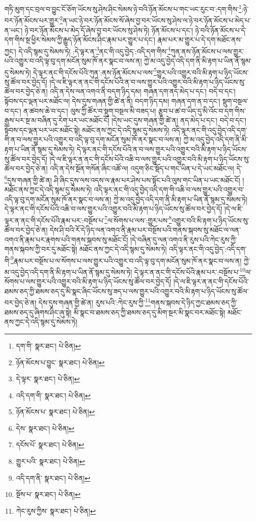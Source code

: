 གཏི་མུག་དང་བྲལ་བ་བྱུང་ངོ་ཅོག་ཡོངས་སུ་ཤེས་ཤིང་སེམས་ཉེ་བའི་ཉོན་མོངས་པ་གང་ཡང་རུང་བ་:དག་གིས་\footnote{དག་གི་  སྣར་ཐང་།  པེ་ཅིན། }:ཉེ་བར་ཉོན་མོངས་པར་གྱུར་\footnote{ཉོན་མོངས་པ་བྱུང་  སྣར་ཐང་།  པེ་ཅིན། }ན་ཡང་ཉེ་བར་ཉོན་མོངས་སོ་ཞེས་བྱ་བར་ཡོངས་སུ་ཤེས་ལ་ཉེ་བར་ཉོན་མོངས་པ་མེད་པ་ན་ཡང་། ཉེ་བར་ཉོན་མོངས་པ་མེད་དོ་ཞེས་བྱ་བར་ཡོངས་སུ་ཤེས་ཏེ། ཉོན་མོངས་པ་དང་། ཉེ་བའི་ཉོན་མོངས་པ་དེ་དག་གིས་སྔ་ཕྱིར་སེམས་ཀྱི་རྒྱུད་ཉོན་མོངས་ཤིང་རྣམ་པར་གྱུར་པ་དང་། རྣམ་པར་མ་གྱུར་པ་དེ་དག་མཐོང་ནས་ཀྱང་། དེ་འདི་སྙམ་དུ་སེམས་ཏེ། :དེ་ལྟར་ན་\footnote{དེ་ལྟར་  སྣར་ཐང་།  པེ་ཅིན། }ནང་གི་འདུ་བྱེད་:འདི་དག་གིས་\footnote{འདི་དག་གི་  སྣར་ཐང་།  པེ་ཅིན། }ཀུན་ནས་ཉོན་མོངས་པ་ལས་གྱུར་པའི་འགྱུར་བ་འདི་ལྟ་བུ་དག་མངོན་སུམ་ཁོ་ནར་སྣང་བ་ལས་ན། ཀྱེ་མ་འདུ་བྱེད་འདི་དག་ནི་མི་རྟག་པ་ཡིན་ནོ་སྙམ་དུ་སེམས་ཏེ། དེ་ལྟར་ནང་གི་དངོས་པོའི་ཀུན་:ནས་ཉོན་མོངས་པ་ལས་\footnote{ཉོན་མོངས་པ་  སྣར་ཐང་།  པེ་ཅིན། }གྱུར་པའི་འགྱུར་བའི་མི་རྟག་པ་ཉིད་ཡོངས་སུ་ཚོལ་བར་བྱེད་དོ། །དེ་ལ་ཇི་ལྟར་ན་ནང་གི་དངོས་པོའི་ན་བ་ལས་གྱུར་པའི་འགྱུར་བའི་མི་རྟག་པ་ཉིད་ཡོངས་སུ་ཚོལ་བར་བྱེད་ཅེ་ན། འདི་ན་དེས་ལན་འགའ་ནི་བདག་ཉིད་དམ། གཞན་དག་ནད་མེད་པ་དང་། བདེ་བ་དང་། སྟོབས་དང་ལྡན་པར་མཐོང་ལ། དེས་དུས་གཞན་གྱི་ཚེ་ན་ནི། བདག་ཉིད་དམ། གཞན་དག་ན་བ་དང་། སྡུག་བསྔལ་བ་དང་། ན་ཚབས་ཆེ་བ་དང་། ལུས་ཀྱི་ཚོར་བ་སྡུག་བསྔལ་མི་བཟད་པ། རྩུབ་པ་ཚ་བ་ཡིད་དུ་མི་འོང་བ་དག་གིས་རྒྱས་པར་སྔ་མ་བཞིན་དུ་རེག་པར་ཡང་མཐོང་ངོ། །དེས་ཡང་དུས་གཞན་གྱི་ཚེ་ན། ནད་མེད་པ་དང་། བདེ་བ་དང་། སྟོབས་དང་ལྡན་པར་ཡང་མཐོང་སྟེ། མཐོང་ནས་ཀྱང་དེ་འདི་སྙམ་དུ་སེམས་ཏེ། འདི་ལྟར་ནང་གི་འདུ་བྱེད་འདི་དག་གི་ན་བ་ལས་གྱུར་པའི་འགྱུར་བ་འདི་ལྟ་བུ་དག་མངོན་སུམ་ཁོ་ནར་སྣང་བ་ལས་ན། ཀྱེ་མ་འདུ་བྱེད་འདི་དག་ནི་མི་རྟག་པ་ཡིན་ནོ་སྙམ་དུ་སེམས་ཏེ། དེ་ལྟར་ནང་གི་དངོས་པོའི་ན་བ་ལས་གྱུར་པའི་འགྱུར་བའི་མི་རྟག་པ་ཉིད་ཡོངས་སུ་ཚོལ་བར་བྱེད་དོ། །དེ་ལ་ཇི་ལྟར་ན་ནང་གི་དངོས་པོའི་འཆི་བ་ལས་གྱུར་པའི་འགྱུར་བའི་མི་རྟག་པ་ཉིད་ཡོངས་སུ་ཚོལ་བར་བྱེད་ཅེ་ན། འདི་ན་དེས་སྔོན་གསོན་ཞིང་འཚོ་ལ། འདུག་ཅིང་སྡོད་པ་གང་ཡིན་པ་དེ་ཡང་མཐོང་ལ། དེ་\footnote{དེས་  སྣར་ཐང་།  པེ་ཅིན། }དུས་གཞན་གྱི་ཚེ་ན། ཤི་ཞིང་དུས་ལས་འདས་ལ་རྣམ་པར་ཤེས་པས་སྟོང་པའི་ལུས་གང་ཡིན་པ་ཡང་མཐོང་ངོ། །མཐོང་ནས་ཀྱང་དེ་འདི་སྙམ་དུ་སེམས་ཏེ། འདི་ལྟར་ནང་གི་འདུ་བྱེད་འདི་དག་གི་འཆི་བ་ལས་གྱུར་པའི་འགྱུར་བ་འདི་ལྟ་བུ་དག་མངོན་སུམ་ཁོ་ནར་སྣང་བ་ལས་ན། ཀྱེ་མ་འདུ་བྱེད་འདི་དག་ནི་མི་རྟག་པ་ཡིན་ནོ་སྙམ་དུ་སེམས་ཏེ། དེ་ལྟར་ནང་གི་དངོས་པོའི་འཆི་བ་ལས་གྱུར་པའི་འགྱུར་བའི་མི་རྟག་པ་ཉིད་ཡོངས་སུ་ཚོལ་བར་བྱེད་དོ། །དེ་ལ་ཇི་ལྟར་ན་ནང་གི་དངོས་པོའི་རྣམ་པར་:བསྔོས་པ་\footnote{དངོས་པོ་  སྣར་ཐང་།  པེ་ཅིན། }ལ་སོགས་པ་ལས་:གྱུར་པས་\footnote{གྱུར་པའི་  སྣར་ཐང་།  པེ་ཅིན། }འགྱུར་བའི་མི་རྟག་པ་ཉིད་ཡོངས་སུ་ཚོལ་བར་བྱེད་ཅེ་ན། དེས་ཤི་བའི་རོ་དེ་ཉིད་ལན་འགའ་ནི་རྣམ་པར་བསྔོས་པའི་གནས་སྐབས་སུ་མཐོང་ལ་ལན་འགའ་ནི་རྣམ་པར་རྣགས་པའི་གནས་སྐབས་སུ་མཐོང་ངོ། །དེ་བཞིན་དུ་ལན་འགའ་ནི་རུས་པའི་ཀེང་རུས་ཀྱི་གནས་སྐབས་ཀྱི་བར་དུ་མཐོང་སྟེ། མཐོང་ནས་ཀྱང་དེ་འདི་སྙམ་དུ་སེམས་ཏེ། འདི་ལྟར་ནང་གི་འདུ་བྱེད་:འདི་དག་གི་\footnote{འདི་དག་ནི་  སྣར་ཐང་།  པེ་ཅིན། }རྣམ་པར་བསྔོས་པ་ལ་སོགས་པ་ལས་གྱུར་པའི་འགྱུར་བ་འདི་ལྟ་བུ་དག་མངོན་སུམ་ཁོ་ནར་སྣང་བ་ལས་ན། ཀྱེ་མ་འདུ་བྱེད་འདི་དག་ནི་མི་རྟག་པ་ཡིན་ནོ་སྙམ་དུ་སེམས་ཏེ། དེ་ལྟར་ན་ནང་གི་དངོས་པོའི་རྣམ་པར་:བསྔོས་པ་\footnote{སྔོས་པ་  སྣར་ཐང་།  པེ་ཅིན། }ལ་སོགས་པ་ལས་གྱུར་པའི་འགྱུར་བའི་མི་རྟག་པ་ཉིད་ཡོངས་སུ་ཚོལ་བར་བྱེད་དོ། །དེ་ལ་ཇི་ལྟར་ན་ནང་གི་དངོས་པོའི་ཐམས་ཅད་ཀྱི་ཐམས་ཅད་དུ་མི་སྣང་ཞིང་ཡོངས་སུ་ཟད་པ་ལས་གྱུར་པའི་འགྱུར་བའི་མི་རྟག་པ་ཉིད་ཡོངས་སུ་ཚོལ་བར་བྱེད་ཅེ་ན། དེས་དུས་གཞན་གྱི་ཚེ་ན། རུས་པའི་:ཀེང་རུས་ཀྱི་\footnote{ཀེང་རུས་ཀྱིས་  སྣར་ཐང་།  པེ་ཅིན། }གནས་སྐབས་དེ་ཉིད་ཀྱང་ཐམས་ཅད་ཀྱི་ཐམས་ཅད་དུ་ཞིགས་ཤིང་ཞུ་སྟེ། མི་སྣང་བ་ཐམས་ཅད་ཀྱི་ཐམས་ཅད་དུ་མིག་སྔར་མི་སྣང་བར་མཐོང་སྟེ། མཐོང་ནས་ཀྱང་དེ་འདི་སྙམ་དུ་སེམས་ཏེ། 